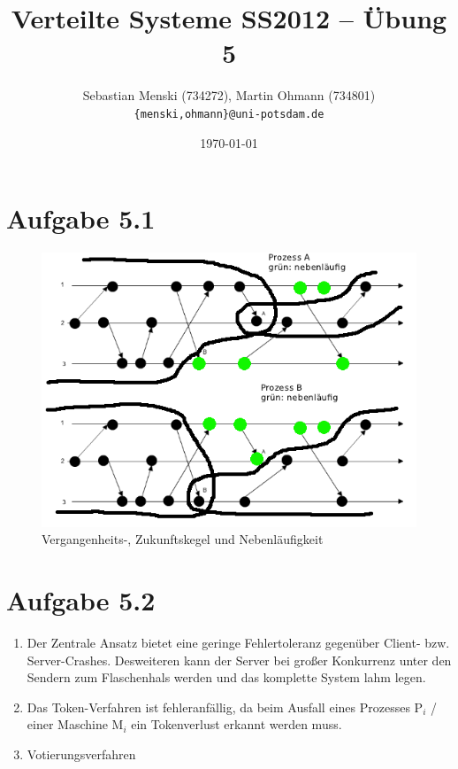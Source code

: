 \documentclass[german,12pt,a4paper]{article}
\begin{document}
\title{\textbf{Verteilte Systeme SS2012 -- Übung 5}}
\author{Sebastian Menski (734272), Martin Ohmann (734801) \\ \texttt{\{menski,ohmann\}@uni-potsdam.de}}
\date{\today}

\maketitle

\section*{Aufgabe 5.1}

\begin{figure}[h!]
  \centering
  \includegraphics[width=1\textwidth]{aufgabe1.png}
  \caption{Vergangenheits-, Zukunftskegel und Nebenläufigkeit}
\end{figure}

\section*{Aufgabe 5.2}

\begin{enumerate}

	\item Der Zentrale Ansatz bietet eine geringe Fehlertoleranz gegenüber 
	Client- bzw. Server-Crashes. Desweiteren kann der Server bei großer 
	Konkurrenz unter den Sendern zum Flaschenhals werden und das komplette 
	System lahm legen.
	
	\item Das Token-Verfahren ist fehleranfällig, da beim Ausfall eines 
	Prozesses P$_{i}$ / einer Maschine M$_{i}$ ein Tokenverlust erkannt werden 
	muss.
	
	\item Votierungsverfahren

\end{enumerate}
\end{document}
